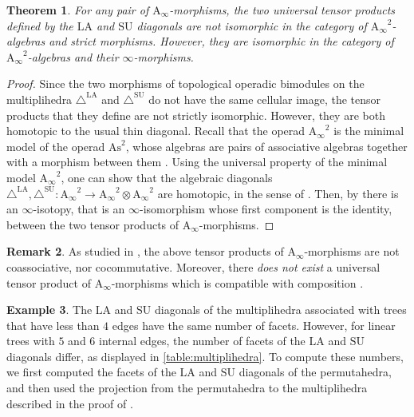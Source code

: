 \documentclass{amsart}
\newtheorem{theorem}{Theorem}[section]
\theoremstyle{definition}
\newtheorem{example}[theorem]{Example}
\newtheorem{remark}[theorem]{Remark}
\newcommand{\SU}{\mathrm{SU}}
\newcommand{\LA}{\mathrm{LA}}
\newcommand{\SUD}{\triangle^{\mathrm{SU}}}
\newcommand{\LAD}{\triangle^{\mathrm{LA}}}
\newcommand{\Ainf}{\ensuremath{\mathrm{A}_\infty}}
\begin{document}
\begin{theorem}
	\label{thm:infinity-iso-2}
	For any pair of $\Ainf$-morphisms, the two universal tensor products defined by the $\LA$ and $\SU$ diagonals are not isomorphic in the category of $\Ainf^2$-algebras and strict morphisms.
	However, they are isomorphic in the category of $\Ainf^2$-algebras and their $\infty$-morphisms.
\end{theorem}

\begin{proof}
	Since the two morphisms of topological operadic bimodules on the multiplihedra $\LAD$ and $\SUD$ do not have the same cellular image, the tensor products that they define are not strictly isomorphic.
	However, they are both homotopic to the usual thin diagonal.
	Recall that the operad $\Ainf^2$ is the minimal model of the operad $\mathrm{As}^2$, whose algebras are pairs of associative algebras together with a morphism between them \cite[Prop.~4.9]{LaplanteAnfossi}. 
	Using the universal property of the minimal model $\Ainf^2$, one can show that the algebraic diagonals $\LAD,\SUD : \Ainf^2 \to \Ainf^2 \otimes \Ainf^2$ are homotopic, in the sense of \cite[Sec.~3.10]{MarklShniderStasheff}.
	Then, by \cite[Cor.~2]{DotsenkoShadrinVallette} there is an $\infty$-isotopy, that is an $\infty$-isomorphism whose first component is the identity, between the two tensor products of $\Ainf$-morphisms.
\end{proof}

\begin{remark}
	As studied in \cite[Sec.~4.4]{LaplanteAnfossiMazuir}, the above tensor products of $\Ainf$-morphisms are not coassociative, nor cocommutative. 
	Moreover, there \emph{does not exist} a universal tensor product of $\Ainf$-morphisms which is compatible with composition \cite[Prop.~4.23]{LaplanteAnfossiMazuir}.
\end{remark}

\begin{example}
	\label{ex:multiplihedra-LA-SU}
	The $\LA$ and $\SU$ diagonals of the multiplihedra associated with trees that have less than $4$ edges have the same number of facets. 
	However, for linear trees with $5$ and $6$ internal edges, the number of facets of the $\LA$ and $\SU$ diagonals differ, as displayed in \cref{table:multiplihedra}.
	To compute these numbers, we first computed the facets of the $\LA$ and $\SU$ diagonals of the permutahedra, and then used the projection from the permutahedra to the multiplihedra described in the proof of \cite[Thm.~3.3.6]{Doker}.
\end{example}
\end{document}
